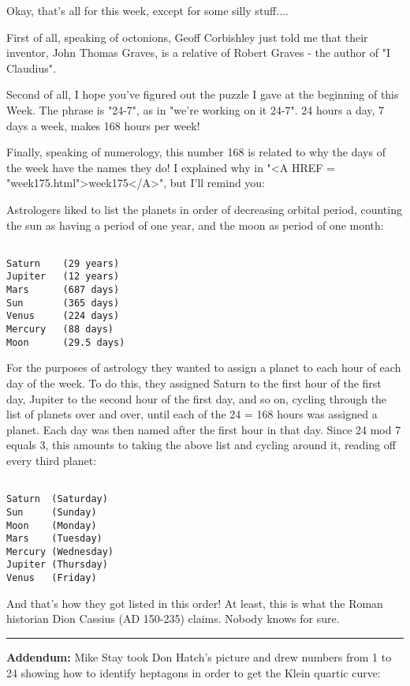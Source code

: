 Okay, that's all for this week, except for some silly stuff....

First of all, speaking of octonions, Geoff Corbishley just told me 
that their inventor, John Thomas Graves, is a relative of Robert 
Graves - the author of "I Claudius". 

Second of all, I hope you've figured out the puzzle I gave at the 
beginning of this Week.  The phrase is "24-7", as in "we're working 
on it 24-7".  24 hours a day, 7 days a week, makes 168 hours per week!

Finally, speaking of numerology, this number 168 is related to why the 
days of the week have the names they do!  I explained why in "<A HREF = "week175.html">week175</A>", 
but I'll remind you:

Astrologers liked to list the planets in order of decreasing orbital 
period, counting the sun as having a period of one year, and the moon 
as period of one month:


\begin{verbatim}

Saturn    (29 years)  
Jupiter   (12 years) 
Mars      (687 days)  
Sun       (365 days)
Venus     (224 days)
Mercury   (88 days)
Moon      (29.5 days)
\end{verbatim}
    
For the purposes of astrology they wanted to assign a planet to each 
hour of each day of the week.  To do this, they assigned Saturn to 
the first hour of the first day, Jupiter to the second hour of the 
first day, and so on, cycling through the list of planets over and 
over, until each of the 24  = 168 hours was assigned a planet.  
Each day was then named after the first hour in that day.  Since 
24 mod 7 equals 3, this amounts to taking the above list and cycling
around it, reading off every third planet:
 

\begin{verbatim}

Saturn  (Saturday)  
Sun     (Sunday)   
Moon    (Monday)  
Mars    (Tuesday)  
Mercury (Wednesday)
Jupiter (Thursday)
Venus   (Friday)
\end{verbatim}
    

And that's how they got listed in this order!  At least, this is what 
the Roman historian Dion Cassius (AD 150-235) claims.  Nobody knows for
sure.


\par\noindent\rule{\textwidth}{0.4pt}

\textbf{Addendum:}
Mike Stay took Don Hatch's picture and drew numbers
from 1 to 24 showing how to identify heptagons in order 
to get the Klein quartic curve:

